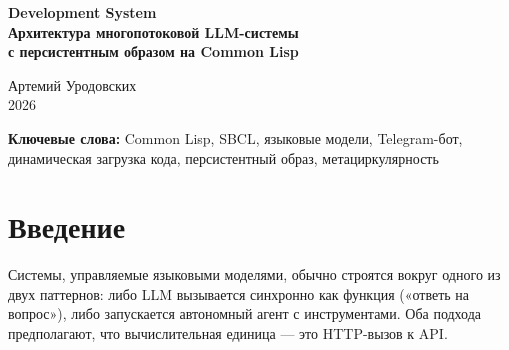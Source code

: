 \documentclass[11pt,a4paper]{article}
\begin{document}
\begin{titlepage}
\centering
\vspace*{2cm}
{\LARGE\bfseries Development System\\[0.4em]
\large Архитектура многопотоковой LLM-системы\\
с персистентным образом на Common Lisp}

\vspace{1.5cm}
{\large Артемий Уродовских}\\[0.3em]
{\normalsize 2026}

\vspace{2cm}
\begin{abstract}
\noindent
Статья описывает \textbf{Development System} — двухкомпонентную систему для оркестрации вычислительных потоков с языковой моделью в роли исполнителя.
Система состоит из \textit{Мастера} — Telegram-бота, написанного на Common Lisp и принимающего команды, — и \textit{Подмастерья} — персистентного SBCL-образа, в который потоки загружаются динамически без перезапуска процесса.

Ключевая идея: поток — это автономный модуль Common Lisp, определяющий единственную функцию \texttt{выполнить/1}. Мастер знает, как потоки запускать и комбинировать; Подмастерье знает, как они загружаются в живой образ и вызываются напрямую, минуя subprocess-оверхед.

Особого внимания заслуживает \textit{поток-порождатель} — поток, который с помощью LLM генерирует новые потоки, компилирует их и загружает в тот же образ, тем самым замыкая метациркулярную петлю исполнения.

Система полностью мигрирована с Racket на Common Lisp. Общий объём кодовой базы — около 1100 строк, система проходит 6 smoke-тестов.
\end{abstract}

\vspace{1cm}
\noindent\textbf{Ключевые слова:} Common Lisp, SBCL, языковые модели, Telegram-бот, динамическая загрузка кода, персистентный образ, метациркулярность
\end{titlepage}

\tableofcontents
\newpage

\section{Введение}

Системы, управляемые языковыми моделями, обычно строятся вокруг одного из двух паттернов: либо LLM вызывается синхронно как функция («ответь на вопрос»), либо запускается автономный агент с инструментами. Оба подхода предполагают, что вычислительная единица — это HTTP-вызов к API.
\end{document}
